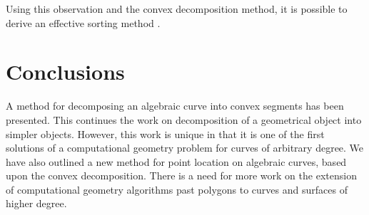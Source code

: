 Using this observation and the convex decomposition method, 
it is possible to derive an effective sorting method \cite{jj}.
%
\section{Conclusions}
A method for decomposing an algebraic curve into convex segments 
has been presented.
This continues the work on decomposition of a geometrical object into
simpler objects.
However, this work is unique in that it is one of the first solutions
of a computational geometry problem for curves of arbitrary degree.
We have also outlined a new method for point location on algebraic curves,
based upon the convex decomposition.
There is a need for more work on the extension of computational
geometry algorithms past polygons to curves and surfaces of higher degree.
%
